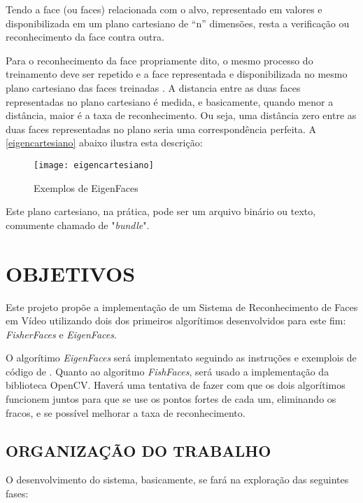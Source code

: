 Tendo a face (ou faces) relacionada com o alvo, representado em valores e disponibilizada em um plano cartesiano de “n” dimensões, resta a verificação ou reconhecimento da face contra outra. 

Para o reconhecimento da face propriamente dito, o mesmo processo do treinamento deve ser repetido e a face representada e disponibilizada no mesmo plano cartesiano das faces treinadas \cite{drmathew_java_programming}. A distancia entre as duas faces representadas no plano cartesiano é medida, e basicamente, quando menor a distância, maior é a taxa de reconhecimento. Ou seja, uma distância zero entre as duas faces representadas no plano seria uma correspondência perfeita. A \autoref{eigencartesiano} abaixo ilustra esta descrição:

\begin{figure}[h]
	\centering
	\texttt{[image: eigencartesiano]}
	\caption{Exemplos de EigenFaces}
	\label{eigencartesiano}
\end{figure}

Este plano cartesiano, na prática, pode ser um arquivo binário ou texto, comumente chamado de "\textit{bundle}".

\section{OBJETIVOS}\label{sec:objetivos}
Este projeto propõe a implementação de um Sistema de Reconhecimento de Faces em Vídeo utilizando dois dos primeiros algorítimos desenvolvidos para este fim: \textit{FisherFaces} e \textit{EigenFaces}.

O algorítimo \textit{EigenFaces} será implementato seguindo as instruções e exemplois de código de \cite{drmathew_java_programming}. Quanto ao algoritmo \textit{FishFaces}, será usado a implementação da biblioteca OpenCV. Haverá uma tentativa de fazer com que os dois algorítimos funcionem juntos para que se use os pontos fortes de cada um, eliminando os fracos, e se possível melhorar a taxa de reconhecimento. 

\subsection{ORGANIZAÇÃO DO TRABALHO}\label{sec:organizacao-trabalho}

O desenvolvimento do sistema, basicamente, se fará na exploração das seguintes fases:

